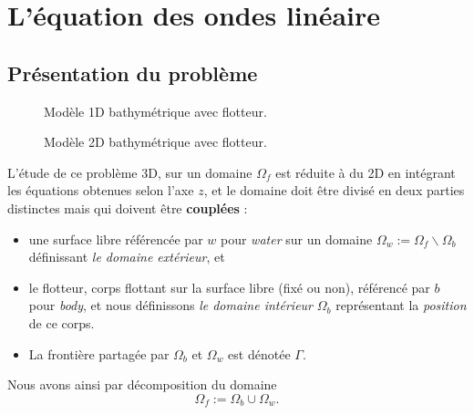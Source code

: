 \section{L'équation des ondes linéaire}
\subsection{Présentation du problème}

\begin{figure}[H]
	\centering
	\caption{Modèle 1D bathymétrique avec flotteur.}
	\label{fig:1dbathy}	
\end{figure}

\begin{figure}[H]
	\centering
	\caption{Modèle 2D bathymétrique avec flotteur.}
	\label{fig:2dbathy}
\end{figure}

\noindent L'étude de ce problème 3D, sur un domaine $\Omega_f$ est réduite à du 2D en intégrant les équations obtenues selon l'axe $z$, et le domaine doit être divisé en deux parties distinctes mais qui doivent être \textbf{couplées} : 
\begin{itemize}[label=$\mybullet$]
	\item une surface libre référencée par $w$ pour \textit{water} sur un domaine $\Omega_w := \Omega_f\backslash \Omega_b$ définissant \textit{le domaine extérieur}, et
	\item le flotteur, corps flottant sur la surface libre (fixé ou non), référencé par $b$ pour \textit{body}, et nous définissons \textit{le domaine intérieur} $\Omega_b$ représentant la \textit{position} de ce corps.
	\item La frontière partagée par $\Omega_b$ et $\Omega_w$ est dénotée $\Gamma$.\\
\end{itemize}
Nous avons ainsi par décomposition du domaine \[\Omega_f := \Omega_b \cup \Omega_w.\]
